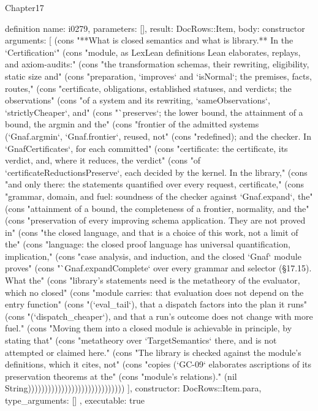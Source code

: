 \begin{lexlean}{Chapter17}
\begin{semanticmodule}
definition{
  name: i0279,
  parameters: [],
  result: DocRows::Item,
  body: constructor{
    arguments: [
      (cons "**What is closed semantics and what is library.** In the `Certification`" (cons "module, as LexLean definitions Lean elaborates, replays, and axiom-audits:" (cons "the transformation schemas, their rewriting, eligibility, static size and" (cons "preparation, `improves` and `isNormal`; the premises, facts, routes," (cons "certificate, obligations, established statuses, and verdicts; the observations" (cons "of a system and its rewriting, `sameObservations`, `strictlyCheaper`, and" (cons "`preserves`; the lower bound, the attainment of a bound, the argmin and the" (cons "frontier of the admitted systems (`Gnaf.argmin`, `Gnaf.frontier`, reused, not" (cons "redefined); and the checker. In `GnafCertificates`, for each committed" (cons "certificate: the certificate, its verdict, and, where it reduces, the verdict" (cons "of `certificateReductionsPreserve`, each decided by the kernel. In the library," (cons "and only there: the statements quantified over every request, certificate," (cons "grammar, domain, and fuel: soundness of the checker against `Gnaf.expand`, the" (cons "attainment of a bound, the completeness of a frontier, normality, and the" (cons "preservation of every improving schema application. They are not proved in" (cons "the closed language, and that is a choice of this work, not a limit of the" (cons "language: the closed proof language has universal quantification, implication," (cons "case analysis, and induction, and the closed `Gnaf` module proves" (cons "`Gnaf.expandComplete` over every grammar and selector (§17.15). What the" (cons "library's statements need is the metatheory of the evaluator, which no closed" (cons "module carries: that evaluation does not depend on the entry function" (cons "(`eval_tail`), that a dispatch factors into the plan it runs" (cons "(`dispatch_cheaper`), and that a run's outcome does not change with more fuel." (cons "Moving them into a closed module is achievable in principle, by stating that" (cons "metatheory over `TargetSemantics` there, and is not attempted or claimed here." (cons "The library is checked against the module's definitions, which it cites, not" (cons "copies (`GC-09` elaborates ascriptions of its preservation theorems at the" (cons "module's relations)." (nil String)))))))))))))))))))))))))))))
    ],
    constructor: DocRows::Item.para,
    type_arguments: []
  },
  executable: true
}


\end{semanticmodule}
\end{lexlean}

